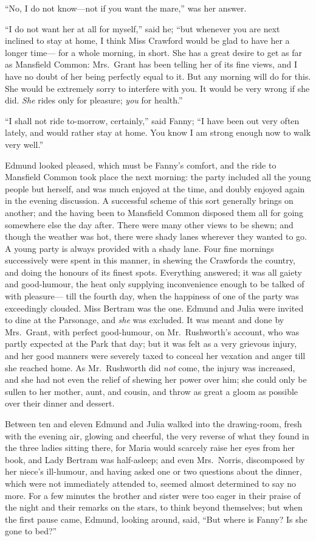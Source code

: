 ``No, I do not know---not if you want the mare,'' was her answer.

``I do not want her at all for myself,'' said he;
``but whenever you are next inclined to stay at home,
I think Miss Crawford would be glad to have her a longer time---%
for a whole morning, in short.  She has a great desire to get
as far as Mansfield Common:  Mrs.\ Grant has been telling
her of its fine views, and I have no doubt of her being
perfectly equal to it.  But any morning will do for this.
She would be extremely sorry to interfere with you.
It would be very wrong if she did.  \emph{She} rides only
for pleasure; \emph{you} for health.''

``I shall not ride to-morrow, certainly,'' said Fanny;
``I have been out very often lately, and would rather
stay at home.  You know I am strong enough now to walk
very well.''

Edmund looked pleased, which must be Fanny's comfort,
and the ride to Mansfield Common took place the next morning:
the party included all the young people but herself,
and was much enjoyed at the time, and doubly enjoyed
again in the evening discussion.  A successful scheme
of this sort generally brings on another; and the having
been to Mansfield Common disposed them all for going
somewhere else the day after.  There were many other
views to be shewn; and though the weather was hot,
there were shady lanes wherever they wanted to go.
A young party is always provided with a shady lane.
Four fine mornings successively were spent in this manner,
in shewing the Crawfords the country, and doing the
honours of its finest spots.  Everything answered;
it was all gaiety and good-humour, the heat only supplying
inconvenience enough to be talked of with pleasure---%
till the fourth day, when the happiness of one of the party
was exceedingly clouded.  Miss Bertram was the one.
Edmund and Julia were invited to dine at the Parsonage,
and \emph{she} was excluded.  It was meant and done by Mrs.\ Grant,
with perfect good-humour, on Mr.\ Rushworth's account,
who was partly expected at the Park that day; but it was felt
as a very grievous injury, and her good manners were severely
taxed to conceal her vexation and anger till she reached home.
As Mr.\ Rushworth did \emph{not} come, the injury was increased,
and she had not even the relief of shewing her power over him;
she could only be sullen to her mother, aunt, and cousin,
and throw as great a gloom as possible over their dinner
and dessert.

Between ten and eleven Edmund and Julia walked into the
drawing-room, fresh with the evening air, glowing and cheerful,
the very reverse of what they found in the three ladies
sitting there, for Maria would scarcely raise her eyes
from her book, and Lady Bertram was half-asleep; and even
Mrs.\ Norris, discomposed by her niece's ill-humour,
and having asked one or two questions about the dinner,
which were not immediately attended to, seemed almost
determined to say no more.  For a few minutes the brother
and sister were too eager in their praise of the night
and their remarks on the stars, to think beyond themselves;
but when the first pause came, Edmund, looking around,
said, ``But where is Fanny?  Is she gone to bed?''

